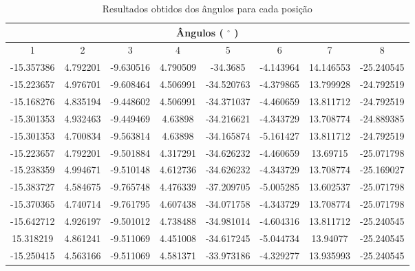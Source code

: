 \begin{table}[!h]
\begin{center}
\begin{tabular} { c c c c c c c c }

\hline
 \multicolumn{8}{c}{ Ângulos ( $^\circ$ ) }\\
\hline
1 & 2 & 3 & 4 & 5 & 6 & 7 & 8 \\
\hline
 -15.357386 & 4.792201 &-9.630516 & 4.790509 & -34.3685 & -4.143964 & 14.146553 & -25.240545 \\
 -15.223657 & 4.976701 & -9.608464 & 4.506991 & -34.520763 & -4.379865 & 13.799928 & -24.792519 \\
 -15.168276 & 4.835194 & -9.448602 & 4.506991 & -34.371037 & -4.460659 & 13.811712 & -24.792519 \\
 -15.301353 & 4.932463 & -9.449469 & 4.63898 & -34.216621 & -4.343729 & 13.708774 & -24.889385\\
 -15.301353 & 4.700834 & -9.563814 & 4.63898 & -34.165874 & -5.161427 & 13.811712 & -24.792519\\
 -15.223657 & 4.792201 & -9.501884 & 4.317291 & -34.626232 & -4.460659 & 13.69715 & -25.071798\\
 -15.238359 & 4.994671 & -9.510148 & 4.612736 & -34.626232 & -4.343729 & 13.708774 & -25.169027\\
 -15.383727 & 4.584675 & -9.765748 & 4.476339 & -37.209705 & -5.005285 & 13.602537 & -25.071798\\
 -15.370365 & 4.740714 & -9.761795 & 4.607438 & -34.071758 & -4.343729 & 13.708774 & -25.071798\\
 -15.642712 & 4.926197 & -9.501012 & 4.738488 & -34.981014 & -4.604316 & 13.811712 & -25.240545\\
15.318219 & 4.861241 & -9.511069 & 4.451008 & -34.617245 & -5.044734 & 13.94077 & -25.240545\\
-15.250415 & 4.563166 & -9.511069 & 4.581371 & -33.973186 & -4.329277 & 13.935993 & -25.240545\\

\hline
\end{tabular}
	\caption{Resultados obtidos dos ângulos para cada posição}
	\label{res:exp_res_obtidos_ang}
\end{center}
\end{table}



